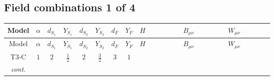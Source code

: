 \documentclass[8pt]{article}
\begin{document}
\begin{landscape}
\subsection*{Field combinations 1 of 4}
\begin{longtable}{@{}cccccccc >{\raggedright\arraybackslash}p{0.21\linewidth} >{\raggedright\arraybackslash}p{0.21\linewidth} >{\raggedright\arraybackslash}p{0.21\linewidth}@{}}
\toprule
Model & $\alpha$ & $d_{S_1}$ & $Y_{S_1}$ & $d_{S_2}$ & $Y_{S_2}$ & $d_F$ & $Y_F$ & $H$ & $B_{\mu\nu}$ & $W_{\mu\nu}$ \\
\midrule
\endfirsthead
\toprule
Model & $\alpha$ & $d_{S_1}$ & $Y_{S_1}$ & $d_{S_2}$ & $Y_{S_2}$ & $d_F$ & $Y_F$ & $H$ & $B_{\mu\nu}$ & $W_{\mu\nu}$ \\
\midrule
\endhead
T3-C & $1$ & $2$ & $\frac{1}{2}$ & $2$ & $\frac{3}{2}$ & $3$ & $1$ & \scriptsize\adjustbox{max width=\linewidth}{$\begin{gathered} +C_{\text{H2}} H_{a_1} H_{a_1}{}^{\dagger } \\ -H_{a_1} \mu ^2 H_{a_1}{}^{\dagger } \\ +\frac{4 \hbar  \overline{\lambda_5} H_{a_1} H_{a_2} \lambda_5 H_{a_1}{}^{\dagger } H_{a_2}{}^{\dagger }}{3 \epsilon }\end{gathered}$} & \scriptsize\adjustbox{max width=\linewidth}{$\begin{gathered} -\frac{41 \hbar  B_{\mu _1\mu _2}^2}{12 \epsilon } \\ -\frac{1}{24} \hbar  \log \left(\frac{\bar{\mu}^{2}}{m_1^2}\right) B_{\mu _1\mu _2}^2 \\ -\frac{3}{8} \hbar  \log \left(\frac{\bar{\mu}^{2}}{m_2^2}\right) B_{\mu _1\mu _2}^2\end{gathered}$} & \scriptsize\adjustbox{max width=\linewidth}{$\begin{gathered} -\frac{25 \hbar  \left(W_{\mu _1\mu _2}^{A_1}\right){}^2}{12 \epsilon } \\ -\frac{1}{24} \hbar  \log \left(\frac{\bar{\mu}^{2}}{m_1^2}\right) \left(W_{\mu _1\mu _2}^{A_1}\right){}^2 \\ -\frac{1}{24} \hbar  \log \left(\frac{\bar{\mu}^{2}}{m_2^2}\right) \left(W_{\mu _1\mu _2}^{A_1}\right){}^2\end{gathered}$} \\
\textit{cont.} &  &  &  &  &  &  &  & \scriptsize\adjustbox{max width=\linewidth}{$\begin{gathered} +\frac{4 \hbar  \overline{\lambda_5} H_{a_1} H_{a_2} m_1^2 \lambda_5 H_{a_1}{}^{\dagger } H_{a_2}{}^{\dagger }}{3 \left(m_1^2-m_2^2\right)} \\ +\frac{4 \hbar  \log \left(\frac{\bar{\mu}^{2}}{m_1^2}\right) \overline{\lambda_5} H_{a_1} H_{a_2} m_1^2 \lambda_5 H_{a_1}{}^{\dagger } H_{a_2}{}^{\dagger }}{3 \left(m_1^2-m_2^2\right)} \\ -\frac{4 \hbar  \overline{\lambda_5} H_{a_1} H_{a_2} m_2^2 \lambda_5 H_{a_1}{}^{\dagger } H_{a_2}{}^{\dagger }}{3 \left(m_1^2-m_2^2\right)}\end{gathered}$} &  &  \\

\end{longtable}
\end{landscape}
\end{document}
